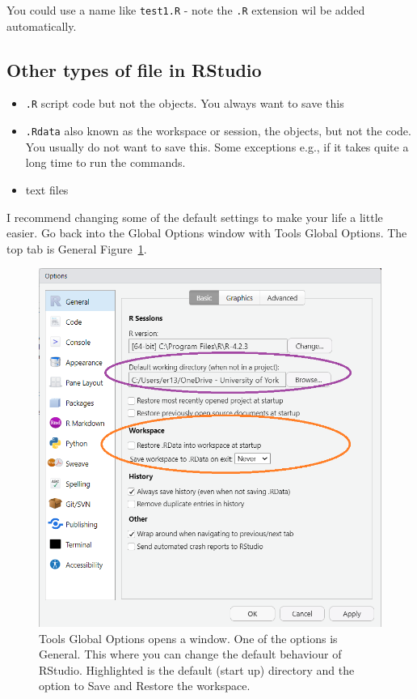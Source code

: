 \documentclass[
  letterpaper,
  DIV=11,
  numbers=noendperiod]{scrreprt}
\providecommand{\tightlist}{%
  \setlength{\itemsep}{0pt}\setlength{\parskip}{0pt}}\usepackage{longtable,booktabs,array}
\begin{document}
You could use a name like \texttt{test1.R} - note the \texttt{.R}
extension wil be added automatically.

\hypertarget{other-types-of-file-in-rstudio}{%
\subsection{Other types of file in
RStudio}\label{other-types-of-file-in-rstudio}}

\begin{itemize}
\tightlist
\item
  \texttt{.R} script code but not the objects. You always want to save
  this
\item
  \texttt{.Rdata} also known as the workspace or session, the objects,
  but not the code. You usually do not want to save this. Some
  exceptions e.g., if it takes quite a long time to run the commands.
\item
  text files
\end{itemize}

I recommend changing some of the default settings to make your life a
little easier. Go back into the Global Options window with Tools
\textbar{} Global Options. The top tab is General
Figure~\ref{fig-tools-global-options-general}.

\begin{figure}

{\centering \includegraphics[width=8.33333in,height=\textheight]{images/tools-global-options-general.png}

}

\caption{\label{fig-tools-global-options-general}Tools \textbar{} Global
Options opens a window. One of the options is General. This where you
can change the default behaviour of RStudio. Highlighted is the default
(start up) directory and the option to Save and Restore the workspace.}

\end{figure}
\end{document}
